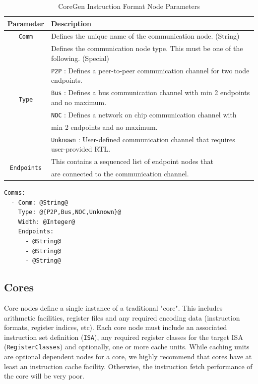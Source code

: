 \documentclass{article}
\begin{document}
\begin{table}[h]
\begin{center}
\caption{CoreGen Instruction Format Node Parameters}
\vspace{0.125in}
\label{tab:CommParams}
\begin{tabular}{|c|l|}
\hline
\textbf{Parameter} & \textbf{Description}\\
\hline
\texttt{Comm} & Defines the unique name of the communication node. (String)\\
\hline
\multirow{6}{*}{\texttt{Type}} & Defines the communication node type.  This must be one of the following. (Special)\\
                                                   & \texttt{P2P} : Defines a peer-to-peer communication channel for two node endpoints.\\
					    & \texttt{Bus} : Defines a bus communication channel with min 2 endpoints and no maximum.\\
					    & \texttt{NOC} : Defines a network on chip communication channel with\\
					    & min 2 endpoints and no maximum.\\
					    & \texttt{Unknown} : User-defined communication channel that requires user-provided RTL.\\
\hline
\multirow{2}{*}{\texttt{Endpoints}} & This contains a sequenced list of endpoint nodes that\\
                                                            & are connected to the communication channel.\\
\hline
\end{tabular}
\end{center}
\end{table}

\vspace{0.125in}
\begin{lstlisting}[frame=single,style=base,caption={Communication Node Definition},captionpos=b,label={lis:comm}]
Comms:
  - Comm: @String@
    Type: @{P2P,Bus,NOC,Unknown}@
    Width: @Integer@
    Endpoints:
      - @String@
      - @String@
      - @String@
\end{lstlisting}

\clearpage
\subsection{Cores}
\label{sec:CoreNodes}

Core nodes define a single instance of a traditional "core".  This includes arithmetic facilities, register files 
and any required encoding data (instruction formats, register indices, etc).  Each core node must include 
an associated instruction set definition (\texttt{ISA}), any required register classes for the target ISA (\texttt{RegisterClasses}) 
and optionally, one or more cache units.  While caching units are optional dependent nodes for a core, we 
highly recommend that cores have at least an instruction cache facility.  Otherwise, the instruction fetch 
performance of the core will be very poor.  
\end{document}
